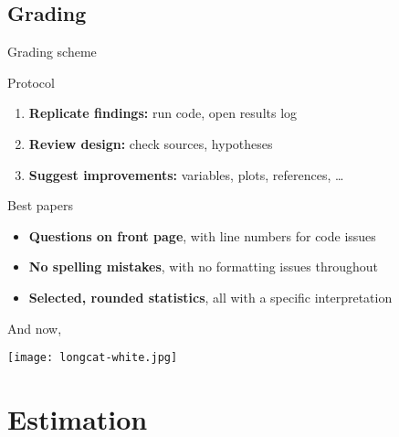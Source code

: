 \documentclass[t]{beamer}
\begin{document}
	\subsection{Grading}
	
	\begin{frame}[t]{Grading scheme}

		\begin{block}{Protocol}
			\begin{enumerate}
				\item \textbf{Replicate findings:} %
					run code, open results log
				\item \textbf{Review design:} %
					check sources, hypotheses
				\item \textbf{Suggest improvements:} %
					variables, plots, references, …
			\end{enumerate}
		\end{block}
		
		\begin{exampleblock}{Best papers}
			\begin{itemize}
				\item \textbf{Questions on front page}, %
					with line numbers for code issues
				\item \textbf{No spelling mistakes}, %
					with no formatting issues throughout
				\item \textbf{Selected, rounded statistics}, %
					all with a specific interpretation
			\end{itemize}
		\end{exampleblock}
		
	\end{frame}
	
	\begin{frame}[t,plain]
		
		\vspace{.3\paperwidth}
		\begin{center}
			{\Large And now, }\\
		\end{center}
		
		\vspace{1em}
		\begin{flushright}
			\texttt{[image: longcat-white.jpg]}		
		\end{flushright}

	\end{frame}
	
	\section{Estimation}
	
\end{document}
